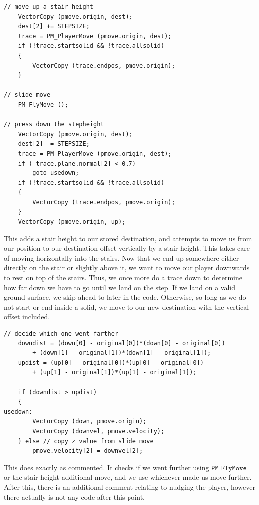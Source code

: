 \documentclass{article}
\begin{document}
\begin{verbatim}
// move up a stair height
	VectorCopy (pmove.origin, dest);
	dest[2] += STEPSIZE;
	trace = PM_PlayerMove (pmove.origin, dest);
	if (!trace.startsolid && !trace.allsolid)
	{
		VectorCopy (trace.endpos, pmove.origin);
	}

// slide move
	PM_FlyMove ();

// press down the stepheight
	VectorCopy (pmove.origin, dest);
	dest[2] -= STEPSIZE;
	trace = PM_PlayerMove (pmove.origin, dest);
	if ( trace.plane.normal[2] < 0.7)
		goto usedown;
	if (!trace.startsolid && !trace.allsolid)
	{
		VectorCopy (trace.endpos, pmove.origin);
	}
	VectorCopy (pmove.origin, up);
\end{verbatim}
This adds a stair height to our stored destination, and attempts to move us from our position to our destination offset vertically by a stair height. This takes care of moving horizontally into the stairs. Now that we end up somewhere either directly on the stair or slightly above it, we want to move our player downwards to rest on top of the stairs. Thus, we once more do a trace down to determine how far down we have to go until we land on the step. If we land on a valid ground surface, we skip ahead to later in the code. Otherwise, so long as we do not start or end inside a solid, we move to our new destination with the vertical offset included. 
\begin{verbatim}
// decide which one went farther
	downdist = (down[0] - original[0])*(down[0] - original[0])
		+ (down[1] - original[1])*(down[1] - original[1]);
	updist = (up[0] - original[0])*(up[0] - original[0])
		+ (up[1] - original[1])*(up[1] - original[1]);

	if (downdist > updist)
	{
usedown:
		VectorCopy (down, pmove.origin);
		VectorCopy (downvel, pmove.velocity);
	} else // copy z value from slide move
		pmove.velocity[2] = downvel[2];
\end{verbatim}
This does exactly as commented. It checks if we went further using $\texttt{PM\_FlyMove}$ or the stair height additional move, and we use whichever made us move further. After this, there is an additional comment relating to nudging the player, however there actually is not any code after this point.
\end{document}
